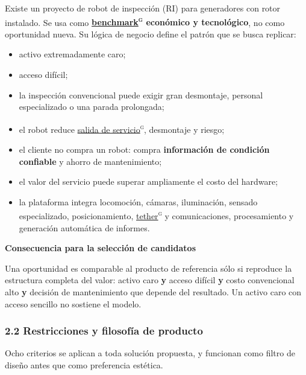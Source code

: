 \documentclass[11pt,a4paper]{article}
\newenvironment{notainferencia}[1]
  {\begin{notainferenciabase}{\sffamily\scriptsize\bfseries\color{green}#1}\par\vspace{2pt}}
  {\end{notainferenciabase}}
\begin{document}
Existe un proyecto de robot de inspección (RI) para generadores con rotor instalado. Se usa como \textbf{\hyperlink{g-benchmark}{benchmark}\textsuperscript{\textsc{g}} económico y tecnológico}, no como oportunidad nueva. Su lógica de negocio define el patrón que se busca replicar:

\begin{itemize}
\item activo extremadamente caro;
\item acceso difícil;
\item la inspección convencional puede exigir gran desmontaje, personal especializado o una parada prolongada;
\item el robot reduce \hyperlink{g-outage}{salida de servicio}\textsuperscript{\textsc{g}}, desmontaje y riesgo;
\item el cliente no compra un robot: compra \textbf{información de condición confiable} y ahorro de mantenimiento;
\item el valor del servicio puede superar ampliamente el costo del hardware;
\item la plataforma integra locomoción, cámaras, iluminación, sensado especializado, posicionamiento, \hyperlink{g-tether}{tether}\textsuperscript{\textsc{g}} y comunicaciones, procesamiento y generación automática de informes.
\end{itemize}

\begin{notainferencia}{Consecuencia para la selección de candidatos}
Una oportunidad es comparable al producto de referencia sólo si reproduce la estructura completa del valor: activo caro \textbf{y} acceso difícil \textbf{y} costo convencional alto \textbf{y} decisión de mantenimiento que depende del resultado. Un activo caro con acceso sencillo no sostiene el modelo.

\end{notainferencia}

\subsubsection*{2.2 Restricciones y filosofía de producto}

Ocho criterios se aplican a toda solución propuesta, y funcionan como filtro de diseño antes que como preferencia estética.
\end{document}
